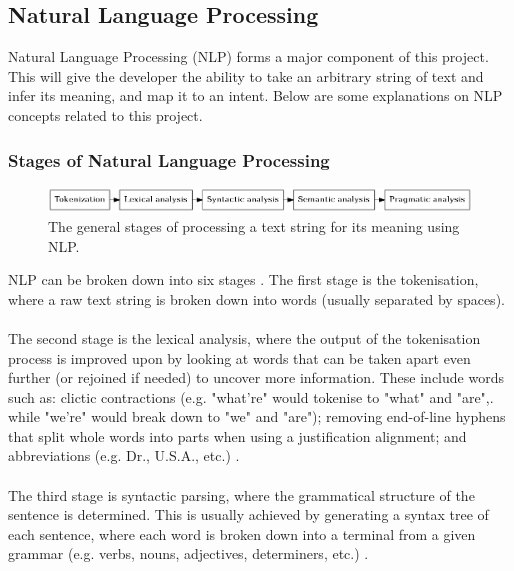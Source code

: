 \documentclass[12pt]{article}
\begin{document}
\subsection{Natural Language Processing}

Natural Language Processing (NLP) forms a major component of this project. This will give the developer the ability to take an arbitrary string of text and infer its meaning, and map it to an intent. Below are some explanations on NLP concepts related to this project.

\subsubsection{Stages of Natural Language Processing}

\begin{center}
\begin{figure}[H]
  \includegraphics[width=\textwidth]{nlp-stages.png}
  \caption{The general stages of processing a text string for its meaning using NLP.}
\end{figure}
\end{center}

NLP can be broken down into six stages \cite{RefWorks:38}. The first stage is the tokenisation, where a raw text string is broken down into words (usually separated by spaces).
\\
\\
The second stage is the lexical analysis, where the output of the tokenisation process is improved upon by looking at words that can be taken apart even further (or rejoined if needed) to uncover more information. These include words such as: clictic contractions (e.g. "what're" would tokenise to "what" and "are",. while "we're" would break down to "we" and "are"); removing end-of-line hyphens that split whole words into parts when using a justification alignment; and abbreviations (e.g. Dr., U.S.A., etc.) \cite{RefWorks:39}.
\\
\\
The third stage is syntactic parsing, where the grammatical structure of the sentence is determined. This is usually achieved by generating a syntax tree of each sentence, where each word is broken down into a terminal from a given grammar (e.g. verbs, nouns, adjectives, determiners, etc.) \cite{RefWorks:40}.
\end{document}
